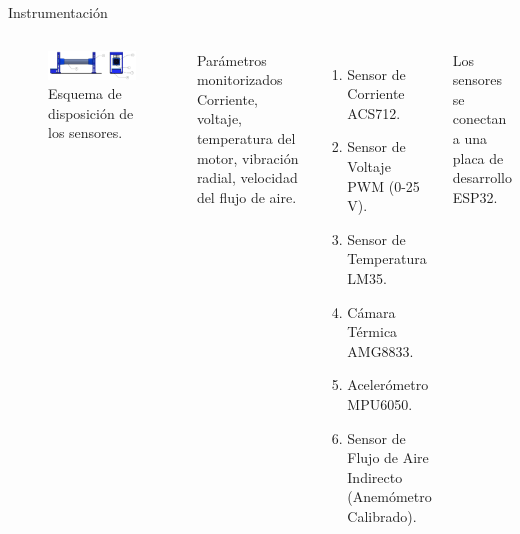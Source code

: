 \begin{frame}{Instrumentación}
    \begin{columns}
        \begin{block}{}
            \begin{figure}[ht!]
                \centering
                \includegraphics[width=\textwidth]{dump/sens.png}
                \caption{Esquema de disposición de los sensores.}
            \end{figure}
            \end{block}
        \begin{block}{Parámetros monitorizados}
          Corriente, voltaje, temperatura del motor, vibración radial, velocidad del flujo de aire.
        \end{block}
        \begin{enumerate}
            \item Sensor de Corriente ACS712.
            \item Sensor de Voltaje PWM (0-25 V).
            \item Sensor de Temperatura LM35.
            \item Cámara Térmica AMG8833.
            \item Acelerómetro MPU6050.
            \item Sensor de Flujo de Aire Indirecto (Anemómetro Calibrado).
        \end{enumerate}
        Los sensores se conectan a una placa de desarrollo ESP32.
    \end{columns}
\end{frame}

